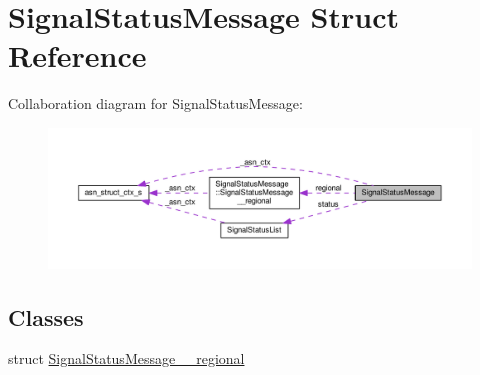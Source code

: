 \hypertarget{structSignalStatusMessage}{}\section{Signal\+Status\+Message Struct Reference}
\label{structSignalStatusMessage}


Collaboration diagram for Signal\+Status\+Message\+:\nopagebreak
\begin{figure}[H]
\begin{center}
\leavevmode
\includegraphics[width=350pt]{structSignalStatusMessage__coll__graph}
\end{center}
\end{figure}
\subsection*{Classes}
\begin{DoxyCompactItemize}
\item 
struct \hyperlink{structSignalStatusMessage_1_1SignalStatusMessage____regional}{Signal\+Status\+Message\+\_\+\+\_\+regional}
\end{DoxyCompactItemize}
